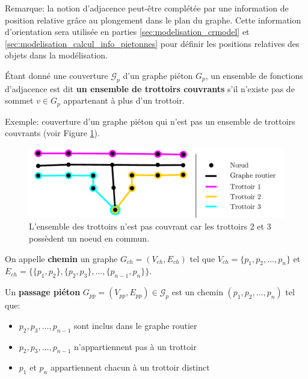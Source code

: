 \noindent
Remarque: la notion d'adjacence peut-être complétée par une information de position relative grâce au plongement dans le plan du graphe. Cette information d'orientation sera utilisée en parties \ref{sec:modelisation_crmodel} et \ref{sec:modelisation_calcul_info_pietonnes} pour définir les positions relatives des objets dans la modélisation.

\begin{definition}
    Étant donné une couverture $\mathcal{G}_p$ d'un graphe piéton $G_p$, un ensemble de fonctions d'adjacence est dit \textbf{un ensemble de trottoirs couvrants} s'il n'existe pas de sommet $v \in G_p$ appartenant à plus d'un trottoir.
\end{definition}

\noindent
Exemple: couverture d'un graphe piéton qui n'est pas un ensemble de trottoirs couvrants (voir Figure \ref{fig:mod_ex_trottoirs_couvrants}).

\begin{figure}[ht]
    \centering
    \includegraphics[width=\textwidth]{images/modelisation/graphe/trottoirs_non_couvrants.pdf}
    \caption[Ensemble de trottoirs non-couvrants]{L'ensemble des trottoirs n'est pas couvrant car les trottoirs 2 et 3 possèdent un noeud en commun.}
    \label{fig:mod_ex_trottoirs_couvrants}
\end{figure}

\begin{definition}
    On appelle \textbf{chemin} un graphe $G_{ch} = (V_{ch}, E_{ch})$ tel que $V_{ch}=\{p_1,p_2,\dots,p_n\}$ et $E_{ch}=\{\{p_1,p_2\},\{p_2,p_3\},\dots,\{p_{n-1},p_n\}\}$.
\end{definition}

\begin{definition}
    Un \textbf{passage piéton} $G_{pp} = (V_{pp}, E_{pp}) \in \mathcal{G}_p$ est un chemin $(p_1, p_2,\dots, p_n)$ tel que:

    \begin{itemize}
        \item $p_2, p_3, \dots, p_{n-1}$ sont inclus dans le graphe routier
        \item $p_2, p_3, \dots, p_{n-1}$ n'appartiennent pas à un trottoir
        \item $p_1$ et $p_n$ appartiennent chacun à un trottoir distinct
    \end{itemize}
\end{definition}

